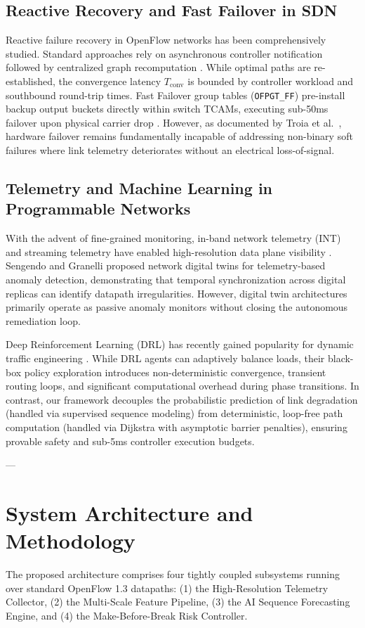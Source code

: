 \documentclass[10pt,twocolumn]{article}
\begin{document}
\subsection{Reactive Recovery and Fast Failover in SDN}
Reactive failure recovery in OpenFlow networks has been comprehensively studied. Standard approaches rely on asynchronous controller notification followed by centralized graph recomputation \cite{mckeown2008openflow}. While optimal paths are re-established, the convergence latency $T_{\text{conv}}$ is bounded by controller workload and southbound round-trip times. Fast Failover group tables (\texttt{OFPGT\_FF}) pre-install backup output buckets directly within switch TCAMs, executing sub-50ms failover upon physical carrier drop \cite{openflow13spec}. However, as documented by Troia et al.\ \cite{troia2025inband}, hardware failover remains fundamentally incapable of addressing non-binary soft failures where link telemetry deteriorates without an electrical loss-of-signal.

\subsection{Telemetry and Machine Learning in Programmable Networks}
With the advent of fine-grained monitoring, in-band network telemetry (INT) and streaming telemetry have enabled high-resolution data plane visibility \cite{troia2025inband}. Sengendo and Granelli \cite{sengendo2026digital} proposed network digital twins for telemetry-based anomaly detection, demonstrating that temporal synchronization across digital replicas can identify datapath irregularities. However, digital twin architectures primarily operate as passive anomaly monitors without closing the autonomous remediation loop. 

Deep Reinforcement Learning (DRL) has recently gained popularity for dynamic traffic engineering \cite{wu2026dynamic}. While DRL agents can adaptively balance loads, their black-box policy exploration introduces non-deterministic convergence, transient routing loops, and significant computational overhead during phase transitions. In contrast, our framework decouples the probabilistic prediction of link degradation (handled via supervised sequence modeling) from deterministic, loop-free path computation (handled via Dijkstra with asymptotic barrier penalties), ensuring provable safety and sub-5ms controller execution budgets.

---

\section{System Architecture and Methodology}
\label{sec:architecture}
The proposed architecture comprises four tightly coupled subsystems running over standard OpenFlow 1.3 datapaths: (1) the High-Resolution Telemetry Collector, (2) the Multi-Scale Feature Pipeline, (3) the AI Sequence Forecasting Engine, and (4) the Make-Before-Break Risk Controller.
\end{document}
